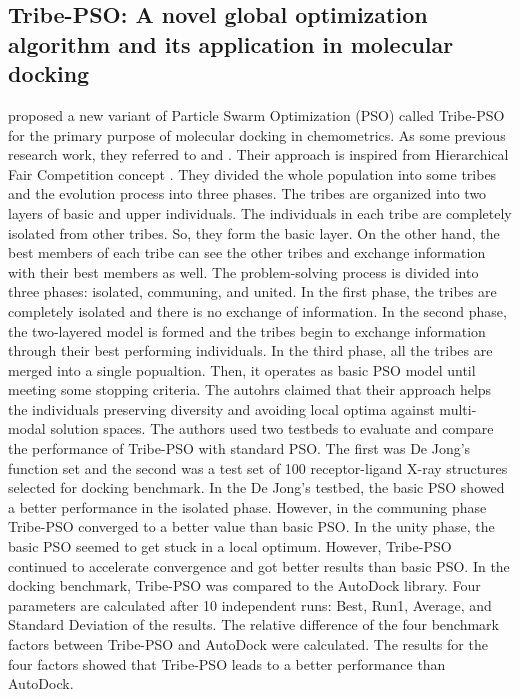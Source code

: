 \subsection{Tribe-PSO: A novel global optimization algorithm and its application in molecular docking}
\citet{chen2006tribe} proposed a new variant of Particle Swarm Optimization (PSO) called Tribe-PSO for the primary purpose of molecular docking in chemometrics. As some previous research work, they referred to \citet{jones1997development} and \citet{clerc2002particle}. Their approach is inspired from Hierarchical Fair Competition concept \citet{jianjun2002adaptive}. They divided the whole population into some tribes and the evolution process into three phases. The tribes are organized into two layers of basic and upper individuals. \newline The individuals in each tribe are completely isolated from other tribes. So, they form the basic layer. On the other hand, the best members of each tribe can see the other tribes and exchange information with their best members as well. The problem-solving process is divided into three phases: isolated, communing, and united. In the first phase, the tribes are completely isolated and there is no exchange of information. In the second phase, the two-layered model is formed and the tribes begin to exchange information through their best performing individuals. In the third phase, all the tribes are merged into a single popualtion. Then, it operates as basic PSO model until meeting some stopping criteria. The autohrs claimed that their approach helps the individuals preserving diversity and avoiding local optima against multi-modal solution spaces.\newline
The authors used two testbeds to evaluate and compare the performance of Tribe-PSO with standard PSO. The first was De Jong's function set and the second was a test set of 100 receptor-ligand X-ray structures selected for docking benchmark. In the De Jong's testbed, the basic PSO showed a better performance in the isolated phase. However, in the communing phase Tribe-PSO converged to a better value than basic PSO. In the unity phase, the basic PSO seemed to get stuck in a local optimum. However, Tribe-PSO continued to accelerate convergence and got better results than basic PSO. In the docking benchmark, Tribe-PSO was compared to the AutoDock library. Four parameters are calculated after 10 independent runs: Best, Run1, Average, and Standard Deviation of the results. The relative difference of the four benchmark factors between Tribe-PSO and AutoDock were calculated. The results for the four factors showed that Tribe-PSO leads to a better performance than AutoDock.
